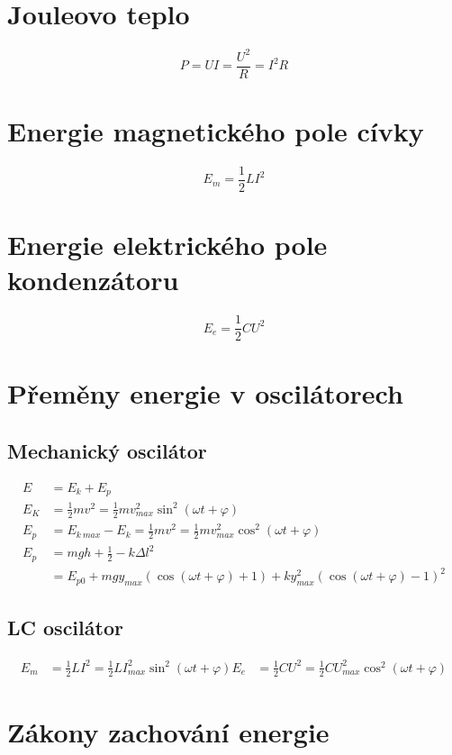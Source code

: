 \documentclass[titlepage]{report}
\begin{document}
\section{Jouleovo teplo}
\begin{equation}
P = UI = \frac{U^2}{R} = I^2R
\end{equation}
\section{Energie magnetického pole cívky}
\begin{equation}
E_m = \frac{1}{2} L I^2
\end{equation}
\section{Energie elektrického pole kondenzátoru}
\begin{equation}
E_e = \frac{1}{2} C U^2
\end{equation}
\section{Přeměny energie v oscilátorech}
\subsection{Mechanický oscilátor}
\begin{align}
E &= E_k + E_p\\
E_K &= \frac{1}{2}mv^2 = \frac{1}{2} m v_{max}^2 \sin^2(\omega t + \varphi)\\
E_p &= E_{k \ max} - E_k = \frac{1}{2}mv^2 = \frac{1}{2} m v_{max}^2 \cos^2(\omega t + \varphi)\\
E_p &= mgh + \frac{1}{2} - k \Delta l^2\\
&= E_{p0} + mg y_{max} (\cos(\omega t + \varphi) + 1) + k y_{max}^2 (\cos(\omega t + \varphi) - 1)^2
\end{align}
\subsection{LC oscilátor}
\begin{align}
E_m &= \frac{1}{2} L I^2 = \frac{1}{2} L I_{max}^2 \sin^2(\omega t + \varphi)
E_e &= \frac{1}{2} C U^2 = \frac{1}{2} C U_{max}^2 \cos^2(\omega t + \varphi)
\end{align}
\section{Zákony zachování energie}
\end{document}
